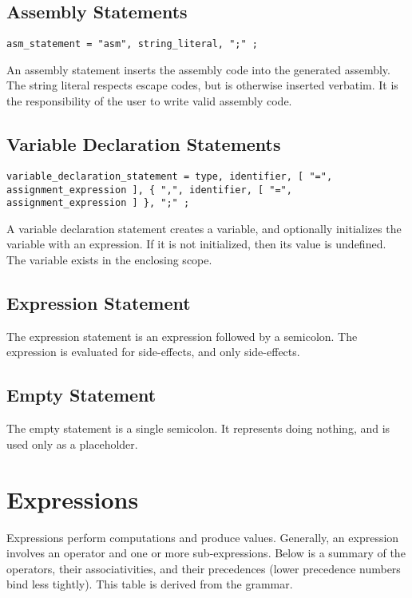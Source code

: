 \documentclass[letterpaper,12pt]{book}
\begin{document}
\section{Assembly Statements}

\begin{lstlisting}[breaklines=true]
asm_statement = "asm", string_literal, ";" ;
\end{lstlisting}

An assembly statement inserts the assembly code into the generated assembly. The string literal respects escape codes, but is otherwise inserted verbatim. It is the responsibility of the user to write valid assembly code.

\section{Variable Declaration Statements}

\begin{lstlisting}[breaklines=true]
variable_declaration_statement = type, identifier, [ "=", assignment_expression ], { ",", identifier, [ "=", assignment_expression ] }, ";" ;
\end{lstlisting}

A variable declaration statement creates a variable, and optionally initializes the variable with an expression. If it is not initialized, then its value is undefined. The variable exists in the enclosing scope.

\section{Expression Statement}

The expression statement is an expression followed by a semicolon. The expression is evaluated for side-effects, and only side-effects.

\section{Empty Statement}

The empty statement is a single semicolon. It represents doing nothing, and is used only as a placeholder.

\chapter{Expressions}

Expressions perform computations and produce values. Generally, an expression involves an operator and one or more sub-expressions. Below is a summary of the operators, their associativities, and their precedences (lower precedence numbers bind less tightly). This table is derived from the grammar.
\end{document}
